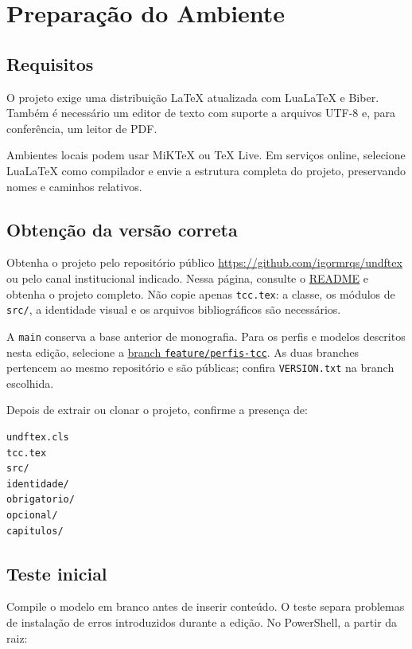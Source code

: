 \chapter{Preparação do Ambiente}

\section{Requisitos}

O projeto exige uma distribuição LaTeX atualizada com LuaLaTeX e Biber. Também é necessário um editor de texto com suporte a arquivos UTF-8 e, para conferência, um leitor de PDF.

Ambientes locais podem usar MiKTeX ou TeX Live. Em serviços online, selecione LuaLaTeX como compilador e envie a estrutura completa do projeto, preservando nomes e caminhos relativos.

\section{Obtenção da versão correta}

Obtenha o projeto pelo repositório público
\url{https://github.com/igormrqs/undftex} ou pelo canal institucional
indicado. Nessa página, consulte o \href{https://github.com/igormrqs/undftex/blob/feature/perfis-tcc/README.md}{README}
e obtenha o projeto completo. Não copie apenas \texttt{tcc.tex}: a classe,
os módulos de \texttt{src/}, a identidade visual e os arquivos bibliográficos
são necessários.

A \texttt{main} conserva a base anterior de monografia. Para os perfis e
modelos descritos nesta edição, selecione a
\href{https://github.com/igormrqs/undftex/tree/feature/perfis-tcc}{branch \texttt{feature/perfis-tcc}}.
As duas branches pertencem ao mesmo repositório e são públicas; confira
\texttt{VERSION.txt} na branch escolhida.

Depois de extrair ou clonar o projeto, confirme a presença de:

\begin{lstlisting}
undftex.cls
tcc.tex
src/
identidade/
obrigatorio/
opcional/
capitulos/
\end{lstlisting}

\section{Teste inicial}

Compile o modelo em branco antes de inserir conteúdo. O teste separa problemas de instalação de erros introduzidos durante a edição. No PowerShell, a partir da raiz:

